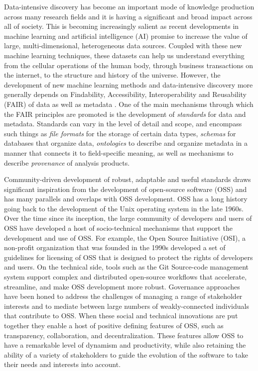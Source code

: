 \documentclass[
  number]{elsarticle}
\begin{document}
Data-intensive discovery has become an important mode of knowledge
production across many research fields and it is having a significant
and broad impact across all of society. This is becoming increasingly
salient as recent developments in machine learning and artificial
intelligence (AI) promise to increase the value of large,
multi-dimensional, heterogeneous data sources. Coupled with these new
machine learning techniques, these datasets can help us understand
everything from the cellular operations of the human body, through
business transactions on the internet, to the structure and history of
the universe. However, the development of new machine learning methods
and data-intensive discovery more generally depends on Findability,
Accessibility, Interoperability and Reusability (FAIR) of data
\citep{Wilkinson2016FAIR} as well as metadata \citep{Musen2022metadata}.
One of the main mechanisms through which the FAIR principles are
promoted is the development of \emph{standards} for data and metadata.
Standards can vary in the level of detail and scope, and encompass such
things as \emph{file formats} for the storage of certain data types,
\emph{schemas} for databases that organize data, \emph{ontologies} to
describe and organize metadata in a manner that connects it to
field-specific meaning, as well as mechanisms to describe
\emph{provenance} of analysis products.

Community-driven development of robust, adaptable and useful standards
draws significant inspiration from the development of open-source
software (OSS) and has many parallels and overlaps with OSS development.
OSS has a long history going back to the development of the Unix
operating system in the late 1960s. Over the time since its inception,
the large community of developers and users of OSS have developed a host
of socio-technical mechanisms that support the development and use of
OSS. For example, the Open Source Initiative (OSI), a non-profit
organization that was founded in the 1990s developed a set of guidelines
for licensing of OSS that is designed to protect the rights of
developers and users. On the technical side, tools such as the Git
Source-code management system support complex and distributed
open-source workflows that accelerate, streamline, and make OSS
development more robust. Governance approaches have been honed to
address the challenges of managing a range of stakeholder interests and
to mediate between large numbers of weakly-connected individuals that
contribute to OSS. When these social and technical innovations are put
together they enable a host of positive defining features of OSS, such
as transparency, collaboration, and decentralization. These features
allow OSS to have a remarkable level of dynamism and productivity, while
also retaining the ability of a variety of stakeholders to guide the
evolution of the software to take their needs and interests into
account.
\end{document}
